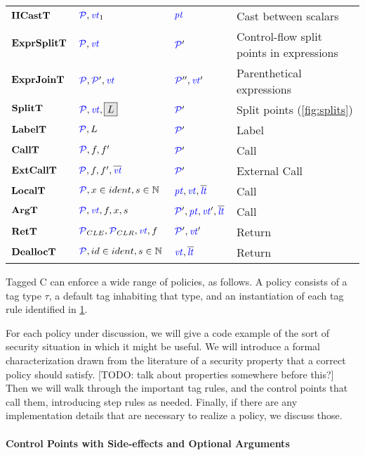 \documentclass{llncs}
\begin{document}
\begin{table}
\begin{tabular}{|l|l|l|l|}
    \(\mathbf{IICastT}\)    & \(\mathcal{\color{blue} P}, \mathit{\color{blue} vt}_1\)       & \(\mathit{\color{blue} pt}\)    & Cast between scalars \\
    \(\mathbf{ExprSplitT}\) & \(\mathcal{\color{blue} P}, \mathit{\color{blue} vt}\)    & \(\mathcal{\color{blue} P}'\) & Control-flow split points in expressions \\
    \(\mathbf{ExprJoinT}\)  & \(\mathcal{\color{blue} P}, \mathcal{\color{blue} P}', \mathit{\color{blue} vt}\)     & \(\mathcal{\color{blue} P}'', \mathit{\color{blue} vt}'\)  & Parenthetical expressions \\
    \(\mathbf{SplitT}\)     & \(\splittargs\)        & \(\mathcal{\color{blue} P}'\)     & Split points (\cref{fig:splits})\\
    \(\mathbf{LabelT}\)     & \(\mathcal{\color{blue} P}, L\)        & \(\mathcal{\color{blue} P}'\)     & Label \\
    \(\mathbf{CallT}\)      & \(\mathcal{\color{blue} P}, f, f'\)         & \(\mathcal{\color{blue} P}'\)      & Call \\
    \(\mathbf{ExtCallT}\)   & \(\mathcal{\color{blue} P}, f, f', \overline{\mathit{\color{blue} vt}}\)      & \(\mathcal{\color{blue} P}'\)   & External Call \\
    \(\mathbf{LocalT}\)     & \(\mathcal{\color{blue} P}, x \in ident, s \in \mathbb{N}\)   & \(\mathit{\color{blue} pt},\mathit{\color{blue} vt},\overline{\mathit{\color{blue} lt}}\)     & Call \\
    \(\mathbf{ArgT}\)       & \(\mathcal{\color{blue} P}, \mathit{\color{blue} vt}, f, x, s\)          & \(\mathcal{\color{blue} P}', \mathit{\color{blue} pt}, \mathit{\color{blue} vt}',\overline{\color{blue} \mathit{\color{blue} lt}}\)       & Call \\
    \(\mathbf{RetT}\)       & \(\mathcal{\color{blue} P}_{CLE}, \mathcal{\color{blue} P}_{CLR}, \mathit{\color{blue} vt}, f\)          & \(\mathcal{\color{blue} P}',\mathit{\color{blue} vt}'\)       & Return \\
    \(\mathbf{DeallocT}\)   & \(\mathcal{\color{blue} P}, id \in ident, s \in \mathbb{N}\) & \(\mathit{\color{blue} vt},\overline{\mathit{\color{blue} lt}}\)   & Return \\
    \hline
  \end{tabular}

  \label{fig:controlpoints}
\end{table}

Tagged C can enforce a wide range of policies, as follows.
A policy consists of a tag type \(\tau\), a default tag inhabiting that type, and an instantiation
of each tag rule identified in \cref{fig:controlpoints}.

For each policy under discussion, we will give a code example of the sort of security
situation in which it might be useful. We will introduce a formal characterization drawn
from the literature of a security property that a correct policy should satisfy.
[TODO: talk about properties somewhere before this?]
Then we will walk through the important tag rules, and the control points that call them,
introducing step rules as needed. Finally, if there are any implementation details that
are necessary to realize a policy, we discuss those.

\paragraph*{Control Points with Side-effects and Optional Arguments}
\end{document}
